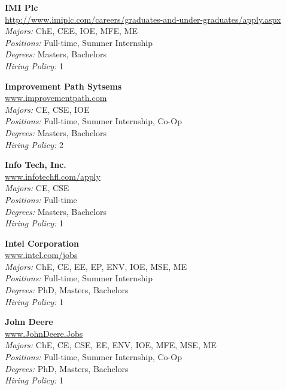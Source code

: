 \documentclass[twoside]{article}
\begin{document}
\begin{center}
\begin{multicols}{3}
\begin{minipage}{.9\columnwidth}{\Large\bf IMI Plc }\\
	\url{http://www.imiplc.com/careers/graduates-and-under-graduates/apply.aspx}\\
	\emph{Majors:} ChE, CEE, IOE, MFE, ME\\
	\emph{Positions:} Full-time, Summer Internship\\
	\emph{Degrees:} Masters, Bachelors\\
	\emph{Hiring Policy:} 1\\
\end{minipage}
 
\begin{minipage}{.9\columnwidth}{\Large\bf Improvement Path Sytsems }\\
	\url{www.improvementpath.com}\\
	\emph{Majors:} CE, CSE, IOE\\
	\emph{Positions:} Full-time, Summer Internship, Co-Op\\
	\emph{Degrees:} Masters, Bachelors\\
	\emph{Hiring Policy:} 2\\
\end{minipage}
 
\begin{minipage}{.9\columnwidth}{\Large\bf Info Tech, Inc. }\\
	\url{www.infotechfl.com/apply}\\
	\emph{Majors:} CE, CSE\\
	\emph{Positions:} Full-time\\
	\emph{Degrees:} Masters, Bachelors\\
	\emph{Hiring Policy:} 1\\
\end{minipage}
 
\begin{minipage}{.9\columnwidth}{\Large\bf Intel Corporation }\\
	\url{www.intel.com/jobs}\\
	\emph{Majors:} ChE, CE, EE, EP, ENV, IOE, MSE, ME\\
	\emph{Positions:} Full-time, Summer Internship\\
	\emph{Degrees:} PhD, Masters, Bachelors\\
	\emph{Hiring Policy:} 1\\
\end{minipage}
 
\begin{minipage}{.9\columnwidth}{\Large\bf John Deere }\\
	\url{www.JohnDeere.Jobs}\\
	\emph{Majors:} ChE, CE, CSE, EE, ENV, IOE, MFE, MSE, ME\\
	\emph{Positions:} Full-time, Summer Internship, Co-Op\\
	\emph{Degrees:} PhD, Masters, Bachelors\\
	\emph{Hiring Policy:} 1\\
\end{minipage}
 

\end{multicols}
\end{center}
\end{document}
